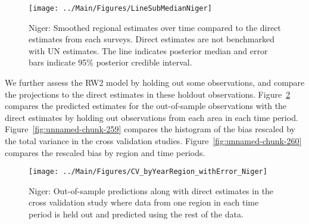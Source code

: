 \documentclass[12pt]{article}\usepackage[]{graphicx}\usepackage[]{color}
\newenvironment{knitrout}{}{} %
\begin{document}
\begin{knitrout}
\color{fgcolor}\begin{figure}[bht]

{\centering \texttt{[image: ../Main/Figures/LineSubMedianNiger]} 

}

\caption[Niger]{Niger: Smoothed regional estimates over time compared to the direct estimates from each surveys. Direct estimates are not benchmarked with UN estimates. The line indicates posterior median and error bars indicate 95\% posterior credible interval.}\label{fig:unnamed-chunk-257}
\end{figure}


\end{knitrout}
We further assess the RW2 model by holding out some observations, and compare the projections to the direct estimates in these holdout observations. Figure~\ref{fig:unnamed-chunk-258} compares the predicted estimates for the out-of-sample observations  with the direct estimates by holding out observations from each area in each time period.  Figure~\ref{fig:unnamed-chunk-259} compares the histogram of the bias rescaled by the total variance in the cross validation studies. Figure~\ref{fig:unnamed-chunk-260} compares the rescaled bias by region and time periods.



 
\begin{knitrout}
\color{fgcolor}\begin{figure}[bht]

{\centering \texttt{[image: ../Main/Figures/CV\_byYearRegion\_withError\_Niger]} 

}

\caption[Niger]{Niger: Out-of-sample predictions along with direct estimates in the cross validation study where data from one region in each time period is held out and predicted using the rest of the data.}\label{fig:unnamed-chunk-258}
\end{figure}


\end{knitrout}
\end{document}
